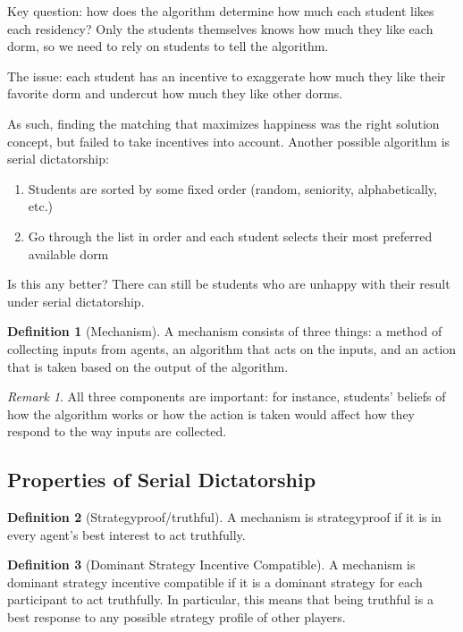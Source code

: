 \documentclass[dvipsnames]{article}
\theoremstyle{definition}
\newtheorem{definition}{Definition}[section]
\theoremstyle{remark}
\newtheorem*{remark}{Remark}
\newenvironment{mech}[1]{\begin{tcolorbox}[colback=red!5!white,colframe=red!75!black,title={#1}]}{\end{tcolorbox}}
\begin{document}
Key question: how does the algorithm determine how much each student likes each residency? Only the students themselves knows how much they like each dorm, so we need to rely on students to tell the algorithm. 

The issue: each student has an incentive to exaggerate how much they like their favorite dorm and undercut how much they like other dorms. 

As such, finding the matching that maximizes happiness was the right solution concept, but failed to take incentives into account. Another possible algorithm is serial dictatorship:

\begin{mech}{Serial Dictatorship}
	\begin{enumerate}
		\item Students are sorted by some fixed order (random, seniority, alphabetically, etc.)
		\item Go through the list in order and each student selects their most preferred available dorm
	\end{enumerate}
\end{mech}

Is this any better? There can still be students who are unhappy with their result under serial dictatorship.

\begin{definition}[Mechanism]
	A mechanism consists of three things: a method of collecting inputs from agents, an algorithm that acts on the inputs, and an action that is taken based on the output of the algorithm.
\end{definition}

\begin{remark}
	All three components are important: for instance, students' beliefs of how the algorithm works or how the action is taken would affect how they respond to the way inputs are collected. 
\end{remark}

\subsection{Properties of Serial Dictatorship}

\begin{definition}[Strategyproof/truthful]
	A mechanism is strategyproof if it is in every agent's best interest to act truthfully.
\end{definition}

\begin{definition}[Dominant Strategy Incentive Compatible]
	A mechanism is dominant strategy incentive compatible if it is a dominant strategy for each participant to act truthfully. In particular, this means that being truthful is a best response to any possible strategy profile of other players.
\end{definition}
\end{document}
